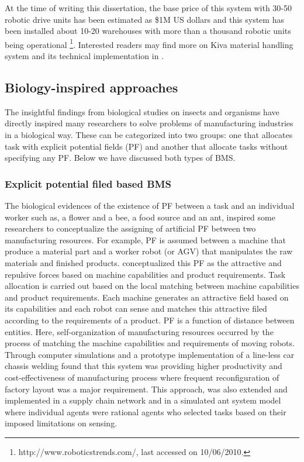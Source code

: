 At the  time of writing this dissertation,  the base price of this system with 30-50 robotic drive units has been estimated as \$1M US dollars and this system has been installed about 10-20 warehouses with more than a thousand robotic units being operational \footnote{http://www.roboticstrends.com/, last accessed on 10/06/2010.}.  Interested readers may find more on Kiva material handling system and its technical implementation in .
\subsection{Biology-inspired approaches}
The insightful findings from biological studies on insects and organisms have directly inspired many researchers to solve problems of manufacturing industries in a biological way. These can be categorized into two groups: one that allocates task with explicit potential fields (PF) and another that allocate tasks without specifying any PF. Below we have discussed both types of BMS.
\subsubsection*{Explicit potential filed based BMS}
The biological evidences of the existence of PF between a task and an individual worker such as, a flower and a bee, a food source and an ant, inspired some researchers to conceptualize the assigning of artificial PF between two manufacturing resources. For example, PF is assumed between a machine that produce a material part and a worker robot (or AGV) that manipulates the raw materials and finished products. \cite{Ueda2006} conceptualized this PF as the attractive and repulsive forces based on machine capabilities and product requirements. Task allocation is carried out based on the local matching between machine capabilities and product requirements. Each machine generates an attractive field based on its capabilities and each robot can sense and matches this attractive filed according to the requirements of a product. PF is a function of distance between entities. Here, self-organization of manufacturing resources occurred by the process of matching the machine capabilities and requirements of moving robots. Through computer simulations and a prototype implementation of a line-less car chassis welding \cite{Ueda2006} found that this system was providing higher productivity and cost-effectiveness of manufacturing process where frequent reconfiguration of factory layout was a major requirement. This approach, was also extended and implemented in a supply chain network and in a simulated ant system model where individual agents were rational agents who selected tasks based on their imposed limitations on sensing.
